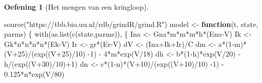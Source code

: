 \documentclass[
  a4paper,
]{scrbook}
\newenvironment{Shaded}{\begin{snugshade}}{\end{snugshade}}
\newcommand{\ControlFlowTok}[1]{\textcolor[rgb]{0.00,0.23,0.31}{\textbf{#1}}}
\newcommand{\DecValTok}[1]{\textcolor[rgb]{0.68,0.00,0.00}{#1}}
\newcommand{\FloatTok}[1]{\textcolor[rgb]{0.68,0.00,0.00}{#1}}
\newcommand{\FunctionTok}[1]{\textcolor[rgb]{0.28,0.35,0.67}{#1}}
\newcommand{\NormalTok}[1]{\textcolor[rgb]{0.00,0.23,0.31}{#1}}
\newcommand{\OtherTok}[1]{\textcolor[rgb]{0.00,0.23,0.31}{#1}}
\newcommand{\SpecialCharTok}[1]{\textcolor[rgb]{0.37,0.37,0.37}{#1}}
\newcommand{\StringTok}[1]{\textcolor[rgb]{0.13,0.47,0.30}{#1}}
\theoremstyle{definition}
\newtheorem{exercise}{Oefening}[chapter]
\theoremstyle{remark}
\begin{document}
\begin{exercise}[Het mengen van een
kringloop]
\begin{Shaded}
\begin{Highlighting}[]
\FunctionTok{source}\NormalTok{(}\StringTok{"https://tbb.bio.uu.nl/rdb/grindR/grind.R"}\NormalTok{)}
\NormalTok{model }\OtherTok{\textless{}{-}} \ControlFlowTok{function}\NormalTok{(t, state, parms) \{}
  \FunctionTok{with}\NormalTok{(}\FunctionTok{as.list}\NormalTok{(}\FunctionTok{c}\NormalTok{(state,parms)), \{}
\NormalTok{    Ina }\OtherTok{\textless{}{-}}\NormalTok{ Gna}\SpecialCharTok{*}\NormalTok{m}\SpecialCharTok{*}\NormalTok{m}\SpecialCharTok{*}\NormalTok{m}\SpecialCharTok{*}\NormalTok{h}\SpecialCharTok{*}\NormalTok{(Ena}\SpecialCharTok{{-}}\NormalTok{V)}
\NormalTok{    Ik }\OtherTok{\textless{}{-}}\NormalTok{ Gk}\SpecialCharTok{*}\NormalTok{n}\SpecialCharTok{*}\NormalTok{n}\SpecialCharTok{*}\NormalTok{n}\SpecialCharTok{*}\NormalTok{n}\SpecialCharTok{*}\NormalTok{(Ek}\SpecialCharTok{{-}}\NormalTok{V)}
\NormalTok{    Ir }\OtherTok{\textless{}{-}}\NormalTok{ gr}\SpecialCharTok{*}\NormalTok{(Er}\SpecialCharTok{{-}}\NormalTok{V)}
\NormalTok{    dV }\OtherTok{\textless{}{-}}\NormalTok{ (Ina}\SpecialCharTok{+}\NormalTok{Ik}\SpecialCharTok{+}\NormalTok{Ir)}\SpecialCharTok{/}\NormalTok{C}
\NormalTok{    dm }\OtherTok{\textless{}{-}}\NormalTok{ a}\SpecialCharTok{*}\NormalTok{(}\DecValTok{1}\SpecialCharTok{{-}}\NormalTok{m)}\SpecialCharTok{*}\NormalTok{(V}\SpecialCharTok{+}\DecValTok{25}\NormalTok{)}\SpecialCharTok{/}\NormalTok{(}\FunctionTok{exp}\NormalTok{((V}\SpecialCharTok{+}\DecValTok{25}\NormalTok{)}\SpecialCharTok{/}\DecValTok{10}\NormalTok{) }\SpecialCharTok{{-}}\DecValTok{1}\NormalTok{) }\SpecialCharTok{{-}} \DecValTok{4}\SpecialCharTok{*}\NormalTok{m}\SpecialCharTok{*}\FunctionTok{exp}\NormalTok{(V}\SpecialCharTok{/}\DecValTok{18}\NormalTok{)}
\NormalTok{    dh }\OtherTok{\textless{}{-}}\NormalTok{ b}\SpecialCharTok{*}\NormalTok{(}\DecValTok{1}\SpecialCharTok{{-}}\NormalTok{h)}\SpecialCharTok{*}\FunctionTok{exp}\NormalTok{(V}\SpecialCharTok{/}\DecValTok{20}\NormalTok{) }\SpecialCharTok{{-}}\NormalTok{ h}\SpecialCharTok{/}\NormalTok{(}\FunctionTok{exp}\NormalTok{((V}\SpecialCharTok{+}\DecValTok{30}\NormalTok{)}\SpecialCharTok{/}\DecValTok{10}\NormalTok{)}\SpecialCharTok{+}\DecValTok{1}\NormalTok{)}
\NormalTok{    dn }\OtherTok{\textless{}{-}}\NormalTok{ c}\SpecialCharTok{*}\NormalTok{(}\DecValTok{1}\SpecialCharTok{{-}}\NormalTok{n)}\SpecialCharTok{*}\NormalTok{(V}\SpecialCharTok{+}\DecValTok{10}\NormalTok{)}\SpecialCharTok{/}\NormalTok{(}\FunctionTok{exp}\NormalTok{((V}\SpecialCharTok{+}\DecValTok{10}\NormalTok{)}\SpecialCharTok{/}\DecValTok{10}\NormalTok{) }\SpecialCharTok{{-}}\DecValTok{1}\NormalTok{) }\SpecialCharTok{{-}} \FloatTok{0.125}\SpecialCharTok{*}\NormalTok{n}\SpecialCharTok{*}\FunctionTok{exp}\NormalTok{(V}\SpecialCharTok{/}\DecValTok{80}\NormalTok{)}
    

\end{Highlighting}
\end{Shaded}
\end{exercise}
\end{document}

